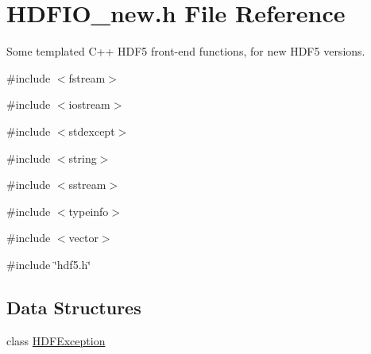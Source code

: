 \section{HDFIO\_\-new.h File Reference}
\label{HDFIO__new_8h}


Some templated C++ HDF5 front-\/end functions, for new HDF5 versions.  


{\ttfamily \#include $<$fstream$>$}\par
{\ttfamily \#include $<$iostream$>$}\par
{\ttfamily \#include $<$stdexcept$>$}\par
{\ttfamily \#include $<$string$>$}\par
{\ttfamily \#include $<$sstream$>$}\par
{\ttfamily \#include $<$typeinfo$>$}\par
{\ttfamily \#include $<$vector$>$}\par
{\ttfamily \#include \char`\"{}hdf5.h\char`\"{}}\par
\subsection*{Data Structures}
\begin{DoxyCompactItemize}
\item 
class \hyperlink{classHDFException}{HDFException}
\end{DoxyCompactItemize}
